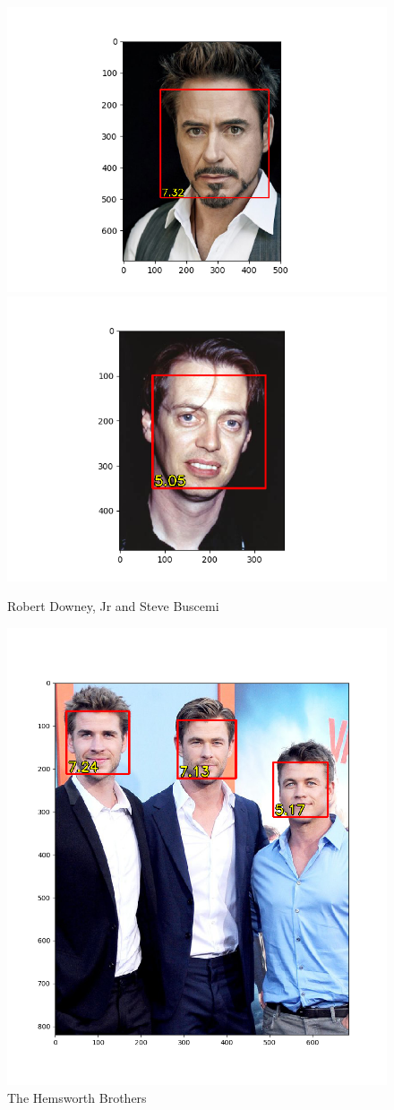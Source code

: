 \documentclass{article}
\begin{document}
\begin{figure}[H]
    \centering
    \includegraphics[width=.4\linewidth]{robert-downey-jr.png}
    \includegraphics[width=.4\linewidth]{steve-buscemi.png}
    \caption{Robert Downey, Jr and Steve Buscemi}
\end{figure}

\begin{figure}[H]
    \centering
    \includegraphics[width=.7\linewidth]{hemsworths.png}
    \caption{The Hemsworth Brothers}
\end{figure}
\end{document}
